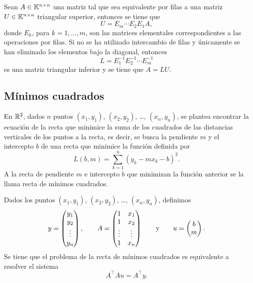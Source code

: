 \documentclass[a4,11pt]{aleph-notas}
\begin{document}
\begin{teo}[Factorización LU]
    Sean $A\in \Mat[\K]{n}{n}$ una matriz tal que sea equivalente por filas a una matriz $U\in \Mat[\K]{n}{n}$ triangular superior, entonces se tiene que
    \[
        U = E_{m}\cdots E_2 E_1 A,
    \]
    donde $E_k$, para $k=1,\ldots,m$, son las matrices elementales correspondientes a las operaciones por filas. Si no se ha utilizado intercambio de filas y únicamente se han eliminado los elementos bajo la diagonal, entonces
    \[
        L = E_{1}^{-1} E_2^{-1} \cdots E_m^{-1}
    \]
    es una matriz triangular inferior y se tiene que $A=LU$.
\end{teo}


\subsection{Mínimos cuadrados}

\begin{defi}
    En $\R^2$, dados $n$ puntos $(x_1,y_1)$, $(x_2,y_2)$, \ldots, $(x_n,y_n)$, se plantea encontrar la ecuación de la recta que minimice la suma de los cuadrados de las distancias verticales de los puntos a la recta, es decir, se busca la pendiente $m$ y el intercepto $b$ de una recta que minimice la función definida por
    \[
        L(b,m)=\sum_{k=1}^n(y_k-mx_k-b)^2.
    \]
    A la recta de pendiente $m$ e intercepto $b$ que minimizan la función anterior se la llama recta de mínimos cuadrados.
\end{defi}

\begin{teo}
    Dados los puntos $(x_1,y_1)$, $(x_2,y_2)$, \ldots, $(x_n,y_n)$, definimos
    \[
        y = \begin{pmatrix}
            y_1 \\ y_2 \\ \vdots \\ y_n
        \end{pmatrix},
        \qquad
        A = \begin{pmatrix}
            1 & x_1 \\ 1 & x_2 \\ \vdots & \vdots \\ 1 & x_n
        \end{pmatrix}
        \texty
        u = \begin{pmatrix}
            b \\ m
        \end{pmatrix}.
    \]
    Se tiene que el problema de la recta de mínimos cuadrados es equivalente a resolver el sistema
    \[
        A^\intercal A u = A^\intercal y.
    \]
\end{teo}
\end{document}
